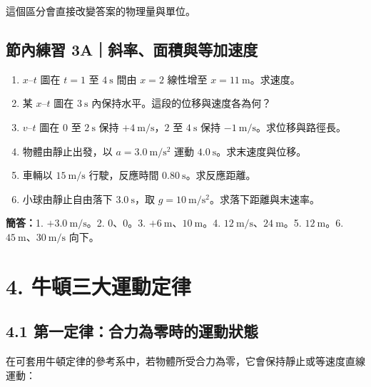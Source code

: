 \documentclass[11pt,a4paper]{article}
\providecommand{\tightlist}{%
  \setlength{\itemsep}{0pt}\setlength{\parskip}{0pt}}
\begin{document}
這個區分會直接改變答案的物理量與單位。

\begin{HandoutSelfCheck}

\subsection{節內練習 3A｜斜率、面積與等加速度}\label{ux7bc0ux5167ux7df4ux7fd2-3aux659cux7387ux9762ux7a4dux8207ux7b49ux52a0ux901fux5ea6}

\begin{enumerate}
\def\labelenumi{\arabic{enumi}.}
\tightlist
\item
  \(x\)--\(t\) 圖在 \(t=1\) 至 \(4\ \mathrm s\) 間由 \(x=2\) 線性增至 \(x=11\ \mathrm m\)。求速度。
\item
  某 \(x\)--\(t\) 圖在 \(3\ \mathrm s\) 內保持水平。這段的位移與速度各為何？
\item
  \(v\)--\(t\) 圖在 \(0\) 至 \(2\ \mathrm s\) 保持 \(+4\ \mathrm{m/s}\)，\(2\) 至 \(4\ \mathrm s\) 保持 \(-1\ \mathrm{m/s}\)。求位移與路徑長。
\item
  物體由靜止出發，以 \(a=3.0\ \mathrm{m/s^2}\) 運動 \(4.0\ \mathrm s\)。求末速度與位移。
\item
  車輛以 \(15\ \mathrm{m/s}\) 行駛，反應時間 \(0.80\ \mathrm s\)。求反應距離。
\item
  小球由靜止自由落下 \(3.0\ \mathrm s\)，取 \(g=10\ \mathrm{m/s^2}\)。求落下距離與末速率。
\end{enumerate}

\textbf{簡答：}1. \(+3.0\ \mathrm{m/s}\)。2. \(0\)、\(0\)。3. \(+6\ \mathrm m\)、\(10\ \mathrm m\)。4. \(12\ \mathrm{m/s}\)、\(24\ \mathrm m\)。5. \(12\ \mathrm m\)。6. \(45\ \mathrm m\)、\(30\ \mathrm{m/s}\) 向下。

\end{HandoutSelfCheck}

\section{4. 牛頓三大運動定律}\label{ux725bux9813ux4e09ux5927ux904bux52d5ux5b9aux5f8b}

\subsection{4.1 第一定律：合力為零時的運動狀態}\label{ux7b2cux4e00ux5b9aux5f8bux5408ux529bux70baux96f6ux6642ux7684ux904bux52d5ux72c0ux614b}

在可套用牛頓定律的參考系中，若物體所受合力為零，它會保持靜止或等速度直線運動：
\end{document}
